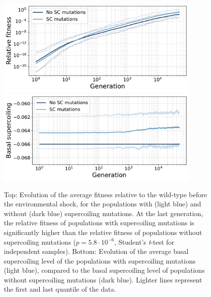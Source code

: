 \begin{figure}
\centering
\includegraphics[width=0.9\textwidth]{epistasis/img/relative_fitness_grouped.pdf}
\includegraphics[width=0.9\textwidth]{epistasis/img/with-sc/basal_sc_all.pdf}
\caption[Average fitness relative to the ancestor and basal supercoiling, during evolution after an environmental shock]{Top: Evolution of the average fitness relative to the wild-type before the environmental shock, for the populations with (light blue) and without (dark blue) supercoiling mutations.
At the last generation, the relative fitness of populations with supercoiling mutations is significantly higher than the relative fitness of populations without supercoiling mutations ($p = 5.8\cdot10^{-6}$, Student's \emph{t}-test for independent samples).
Bottom: Evolution of the average basal supercoiling level of the populations with supercoiling mutations (light blue), compared to the basal supercoiling level of populations without supercoiling mutations (dark blue).
Lighter lines represent the first and last quantile of the data.}
\label{fig:epistasis:rel-fitness}
\end{figure}

